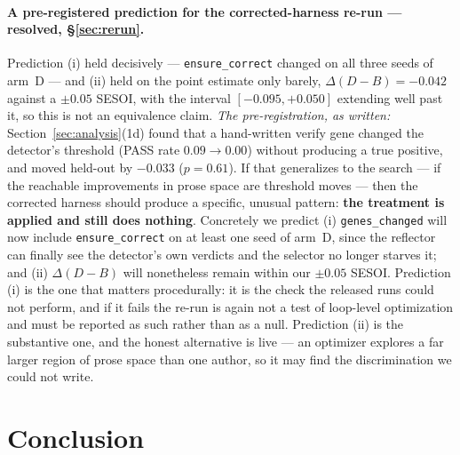 \documentclass[11pt]{article}
\newcommand{\dd}{\ensuremath{\Delta}}
\begin{document}
\paragraph{A pre-registered prediction for the corrected-harness re-run --- \textbf{resolved,
\S\ref{sec:rerun}}.} Prediction (i) held decisively --- \texttt{ensure\_correct} changed on all
three seeds of arm~D --- and (ii) held on the point estimate only barely, $\dd(D-B) = -0.042$
against a $\pm0.05$ SESOI, with the interval $[-0.095,+0.050]$ extending well past it, so this is
not an equivalence claim. \emph{The pre-registration, as written:} Section~\ref{sec:analysis}(1d)
found that a hand-written verify gene changed the detector's threshold (PASS rate $0.09 \to
0.00$) without producing a true positive, and moved held-out by $-0.033$ ($p=0.61$). If that
generalizes to the search --- if the reachable improvements in prose space are threshold moves
--- then the corrected harness should produce a specific, unusual pattern: \textbf{the
treatment is applied and still does nothing}. Concretely we predict (i) \texttt{genes\_changed}
will now include \texttt{ensure\_correct} on at least one seed of arm~D, since the reflector can
finally see the detector's own verdicts and the selector no longer starves it; and (ii)
$\dd(D-B)$ will nonetheless remain within our $\pm0.05$ SESOI. Prediction (i) is the one that
matters procedurally: it is the check the released runs could not perform, and if it fails the
re-run is again not a test of loop-level optimization and must be reported as such rather than
as a null. Prediction (ii) is the substantive one, and the honest alternative is live --- an
optimizer explores a far larger region of prose space than one author, so it may find the
discrimination we could not write.

\section{Conclusion}
\label{sec:conclusion}
\end{document}
